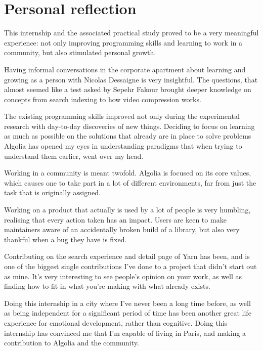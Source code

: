 \section*{Personal reflection}

This internship and the associated practical study proved to be a very meaningful experience: not only improving programming skills and learning to work in a community, but also stimulated personal growth.

Having informal conversations in the corporate apartment about learning and growing as a person with Nicolas Dessaigne is very insightful. The questions, that almost seemed like a test asked by Sepehr Fakour brought deeper knowledge on concepts from search indexing to how video compression works.

The existing programming skills improved not only during the experimental research with day-to-day discoveries of new things. Deciding to focus on learning as much as possible on the solutions that already  are in place to solve problems Algolia has opened my eyes in understanding paradigms that when trying to understand them earlier, went over my head.

Working in a community is meant twofold. Algolia is focused on its core values, which causes one to take part in a lot of different environments, far from just the task that is originally assigned.

Working on a product that actually is used by a lot of people is very humbling, realising that every action taken has an impact. Users are keen to make maintainers aware of an accidentally broken build of a library, but also very thankful when a bug they have is fixed.

Contributing on the search experience and detail page of Yarn has been, and is one of the biggest single contributions I've done to a project that didn't start out as mine. It's very interesting to see people's opinion on your work, as well as finding how to fit in what you're making with  what already exists.

Doing this internship in a city where I've never been a long time before, as well as being independent for a significant period of time has been another great life experience for emotional development, rather than cognitive. Doing this internship has convinced me that I'm capable of living in Paris, and making a contribution to Algolia and the community.
